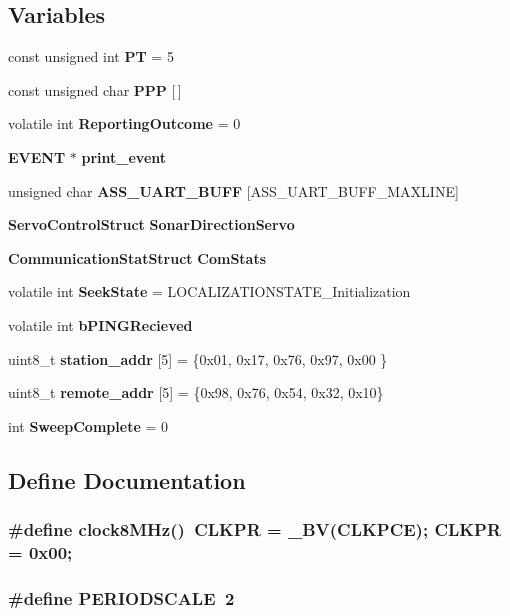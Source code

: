 \subsection*{Variables}
\begin{CompactItemize}
\item 
const unsigned int {\bf PT} = 5
\item 
const unsigned char {\bf PPP} [$\,$]
\item 
volatile int {\bf Reporting\-Outcome} = 0
\item 
{\bf EVENT} $\ast$ {\bf print\_\-event}
\item 
unsigned char {\bf ASS\_\-UART\_\-BUFF} [ASS\_\-UART\_\-BUFF\_\-MAXLINE]
\item 
{\bf Servo\-Control\-Struct} {\bf Sonar\-Direction\-Servo}
\item 
{\bf Communication\-Stat\-Struct} {\bf Com\-Stats}
\item 
volatile int {\bf Seek\-State} = LOCALIZATIONSTATE\_\-Initialization
\item 
volatile int {\bf b\-PINGRecieved}
\item 
uint8\_\-t {\bf station\_\-addr} [5] = \{0x01, 0x17, 0x76, 0x97, 0x00 \}
\item 
uint8\_\-t {\bf remote\_\-addr} [5] = \{0x98, 0x76, 0x54, 0x32, 0x10\}
\item 
int {\bf Sweep\-Complete} = 0
\end{CompactItemize}


\subsection{Define Documentation}
\subsubsection{\setlength{\rightskip}{0pt plus 5cm}\#define clock8MHz()~CLKPR = \_\-BV(CLKPCE); CLKPR = 0x00;}\label{_assignment2_8c_dee69809a753ed21d281078ec7563eba}


\subsubsection{\setlength{\rightskip}{0pt plus 5cm}\#define PERIODSCALE~2}\label{_assignment2_8c_ad04667b64235b8be982767215f64c2d}


